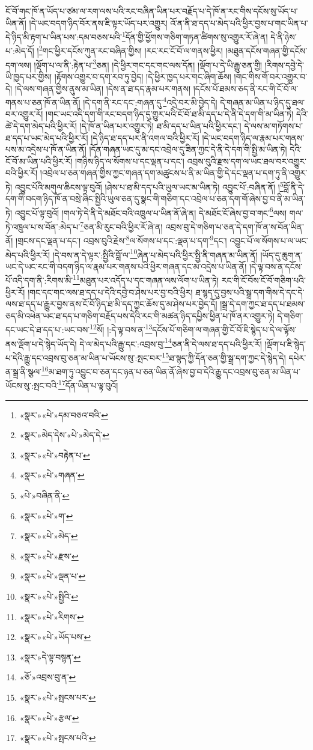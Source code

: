 ངོ་བོ་གང་ཁོ་ན་ཡོད་པ་ཙམ་ལ་རག་ལས་པའི་རང་བཞིན་ཡིན་པར་བརྗོད་པ་དེ་ཁོ་ན་རང་གིས་དངོས་སུ་ཡོད་པ་ཡིན་ནོ། །དེ་ཡང་བདག་ཉིད་བོར་ནས་ཇི་ལྟར་ཡོད་པར་འགྱུར། འོ་ན་ནི་ཐ་དད་པ་མེད་པའི་ཕྱིར་བྱས་པ་གང་ཡིན་པ་དེ་ཉིད་མི་རྟག་པ་ཡིན་པས་:དམ་བཅས་པའི་\footnote{«སྣར་»«པེ་»དམ་བཅའ་བའི་}དོན་གྱི་ཕྱོགས་གཅིག་གཏན་ཚིགས་སུ་འགྱུར་རོ་ཞེ་ན། དེ་ནི་ཉེས་པ་:མེད་དོ། །\footnote{«སྣར་»མེད་དེས་«པེ་»མེད་དེ་}གང་ཕྱིར་དངོས་ཀུན་རང་བཞིན་གྱིས། །རང་རང་ངོ་བོ་ལ་གནས་ཕྱིར། །མཐུན་དངོས་གཞན་གྱི་དངོས་དག་ལས། །ལྡོག་པ་ལ་ནི་:རྟེན་པ་\footnote{«སྣར་»«པེ་»བརྟེན་པ་}ཅན། །དེ་ཕྱིར་གང་དང་གང་ལས་དོན། །ལྡོག་པ་དེ་ཡི་རྒྱུ་ཅན་གྱི། །རིགས་དབྱེ་དེ་ཡི་ཁྱད་པར་གྱིས། །རྟོགས་འགྱུར་བ་དག་རབ་ཏུ་བྱེད། །དེ་ཕྱིར་ཁྱད་པར་གང་ཞིག་ཆོས། །གང་གིས་གོ་བར་འགྱུར་བ་དེ། །དེ་ལས་གཞན་གྱིས་ནུས་མ་ཡིན། །དེས་ན་ཐ་དད་རྣམ་པར་གནས། །དངོས་པོ་ཐམས་ཅད་ནི་རང་གི་ངོ་བོ་ལ་གནས་པ་ཅན་ཁོ་ན་ཡིན་ནོ། །དེ་དག་ནི་རང་དང་:གཞན་དུ་\footnote{«སྣར་»«པེ་»གཞན་}འདྲེ་བར་མི་བྱེད་དེ། དེ་གཞན་མ་ཡིན་པ་ཉིད་དུ་ཐལ་བར་འགྱུར་རོ། །གང་ཡང་འདི་དག་གི་རང་བདག་ཉིད་དུ་གྱུར་པའི་ངོ་བོ་ཐ་མི་དད་པ་དེ་ནི་དེ་དག་གི་མ་ཡིན་ཏེ། དེའི་ཚེ་དེ་དག་མེད་པའི་ཕྱིར་རོ། །དེ་ཁོ་ན་ཡིན་པར་འགྱུར་ཏེ། ཐ་མི་དད་པ་ཡིན་པའི་ཕྱིར་དང་། དེ་ལས་མ་གཏོགས་པ་ཐ་དད་པ་ཡང་མེད་པའི་ཕྱིར་རོ། །དེ་ཉིད་ཐ་དད་པར་ནི་འགལ་བའི་ཕྱིར་རོ། །དེ་ཡང་བདག་ཉིད་ལ་རྣམ་པར་གནས་པས་མ་འདྲེས་པ་ཁོ་ན་ཡིན་ནོ། །དོན་གཞན་ཡང་དུ་མ་དང་འབྲེལ་དུ་ཟིན་ཀྱང་དེ་ནི་དེ་དག་གི་སྤྱི་མ་ཡིན་ཏེ། དེའི་ངོ་བོ་མ་ཡིན་པའི་ཕྱིར་རོ། །གཉིས་ཉིད་ལ་སོགས་པ་དང་ལྡན་པ་དང་། འབྲས་བུའི་རྫས་དག་ལ་ཡང་ཐལ་བར་འགྱུར་བའི་ཕྱིར་རོ། །འབྲེལ་པ་ཅན་གཞན་གྱིས་ཀྱང་གཞན་དག་མཚུངས་པ་ནི་མ་ཡིན་གྱི་དེ་དང་ལྡན་པ་དག་ཏུ་ནི་འགྱུར་ཏེ། འབྱུང་པོའི་མགུལ་ཆིངས་ལྟ་བུའོ། །ཤེས་པ་ཐ་མི་དད་པའི་ཡུལ་ཡང་མ་ཡིན་ཏེ། འབྱུང་པོ་:བཞིན་ནོ། །\footnote{«པེ་»བཞིན་ནི་}བློ་ནི་དེ་དག་གི་བདག་ཉིད་ཁོ་ན་བསྲེ་ཞིང་སྤྱིའི་ཡུལ་ཅན་དུ་སྣང་གི་གཅིག་དང་འབྲེལ་པ་ཅན་དག་གོ་ཞེས་བྱ་བ་ནི་མ་ཡིན་ཏེ། འབྱུང་པོ་ལྟ་བུའོ། །གལ་ཏེ་དེ་ནི་དེ་མཐོང་བའི་འཁྲུལ་པ་ཡིན་ནོ་ཞེ་ན། དེ་མཐོང་ངོ་ཞེས་བྱ་བ་གང་\footnote{«སྣར་»«པེ་»ག་}ལས། གལ་ཏེ་འཁྲུལ་པ་ས་བོན་:མེད་པ་\footnote{«སྣར་»«པེ་»མེད་}ཅན་མི་རུང་བའི་ཕྱིར་རོ་ཞེ་ན། འབྲས་བུ་དེ་གཅིག་པ་ཅན་དེ་དག་ཁོ་ན་ས་བོན་ཡིན་ནོ། །གྲངས་དང་ལྡན་པ་དང་། འབྲས་བུའི་རྗེས་\footnote{«སྣར་»«པེ་»རྫས་}ལ་སོགས་པ་དང་:ལྡན་པ་དག་\footnote{«སྣར་»«པེ་»ལྡན་པ་}དང་། འབྱུང་པོ་ལ་སོགས་པ་ལ་ཡང་མེད་པའི་ཕྱིར་རོ། །དེ་བས་ན་དེ་ལྟར་:སྤྱིའི་བློ་ལ་\footnote{«སྣར་»«པེ་»སྤྱིའི་}ཞེན་པ་མེད་པའི་ཕྱིར་སྤྱི་ནི་གཞན་མ་ཡིན་ནོ། །ཡོད་དུ་ཆུག་ན་ཡང་དེ་ཡང་རང་གི་བདག་ཉིད་ལ་རྣམ་པར་གནས་པའི་ཕྱིར་གཞན་དང་མ་འདྲེས་པ་ཡིན་ནོ། །དེ་ལྟ་བས་ན་དངོས་པོ་འདི་དག་ནི་:རིགས་མི་\footnote{«སྣར་»«པེ་»རིགས་}མཐུན་པར་འདོད་པ་དང་གཞན་ལས་ལོག་པ་ཡིན་ཏེ། རང་གི་ངོ་བོས་ངོ་བོ་གཅིག་པའི་ཕྱིར་རོ། །གང་དང་གང་ལས་ཐ་དད་པ་དེའི་དབྱེ་བ་ཤེས་པར་བྱ་བའི་ཕྱིར། ཐ་སྙད་དུ་བྱས་པའི་སྒྲ་དག་གིས་དེ་དང་དེ་ལས་ཐ་དད་པ་རྒྱུར་བྱས་ནས་ངོ་བོ་ཉིད་ཐ་མི་དད་ཀྱང་ཆོས་དུ་མ་ཤེས་པར་བྱེད་དོ། །སྒྲ་དེ་དག་ཀྱང་ཐ་དད་པ་ཐམས་ཅད་མི་འཕེན་ཡང་ཐ་དད་པ་གཅིག་བརྗོད་པས་དེའི་རང་གི་མཚན་ཉིད་དཔྱིས་ཕྱིན་པ་ཁོ་ནར་འགྱུར་ཏེ། དེ་གཅིག་དང་ཡང་དེ་ཐ་དད་པ་:ཡང་བས་\footnote{«སྣར་»«པེ་»ཡོད་པས་}སོ། །:དེ་ལྟ་བས་ན་\footnote{«སྣར་»དེ་ལྟ་བསྙན་}དངོས་པོ་གཅིག་ལ་གཞན་གྱི་ངོ་བོ་ཇི་སྙེད་པ་དེ་ལ་ལྟོས་ནས་ལྡོག་པ་དེ་སྙེད་ཡོད་དེ། དེ་ལ་མེད་པའི་རྒྱུ་དང་:འབྲས་བུ་\footnote{«ཅོ་»འབྲས་བུ་ན་}ཅན་ནི་དེ་ལས་ཐ་དད་པའི་ཕྱིར་རོ། །ལྡོག་པ་ཇི་སྙེད་པ་དེའི་རྒྱུ་དང་འབྲས་བུ་ཅན་མ་ཡིན་པ་ཡོངས་སུ་:སྤང་བར་\footnote{«སྣར་»«པེ་»སྤངས་པར་}ཐ་སྙད་ཀྱི་དོན་ཅན་གྱི་སྒྲ་དག་ཀྱང་དེ་སྙེད་དེ། དཔེར་ན་སྒྲ་ནི་སྩལ་\footnote{«སྣར་»«པེ་»རྩལ་}མ་ཐག་ཏུ་འབྱུང་བ་ཅན་དང་ཉན་པ་ཅན་ཡིན་ནོ་ཞེས་བྱ་བ་དེའི་རྒྱུ་དང་འབྲས་བུ་ཅན་མ་ཡིན་པ་ཡོངས་སུ་:སྤང་བའི་\footnote{«སྣར་»«པེ་»སྤངས་པའི་}དོན་ཡིན་པ་ལྟ་བུའོ། 